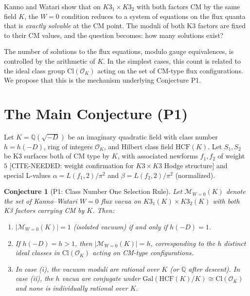 \documentclass[12pt,a4paper]{article}
\theoremstyle{plain}
\newtheorem{conjecture}[theorem]{Conjecture}
\theoremstyle{definition}
\newcommand{\Q}{\mathbb{Q}}
\newcommand{\OK}{\mathcal{O}_K}
\newcommand{\HCF}{\mathrm{HCF}}
\newcommand{\Gal}{\mathrm{Gal}}
\begin{document}
Kanno and Watari show \cite{KannoWatari2024} that on $K3_1 \times K3_2$
with both factors CM by the same field $K$, the $W=0$ condition reduces to
a system of equations on the flux quanta that is \emph{exactly solvable} at
the CM point. The moduli of both K3 factors are fixed to their CM values,
and the question becomes: how many solutions exist?

The number of solutions to the flux equations, modulo gauge equivalences, is
controlled by the arithmetic of $K$. In the simplest cases, this count is
related to the ideal class group $\mathrm{Cl}(\OK)$ acting on the set of
CM-type flux configurations. We propose that this is the mechanism underlying
Conjecture P1.

\section{The Main Conjecture (P1)}
\label{sec:conjecture}

Let $K = \Q(\sqrt{-D})$ be an imaginary quadratic field with class number
$h = h(-D)$, ring of integers $\OK$, and Hilbert class field $\HCF(K)$.
Let $S_1, S_2$ be K3 surfaces both of CM type by $K$, with associated
newforms $f_1, f_2$ of weight $5$ [CITE-NEEDED: weight confirmation for
$K3 \times K3$ Hodge structure] and special L-values
$\alpha = L(f_1, 2) / \pi^2$ and $\beta = L(f_2, 2) / \pi^2$ (normalized).

\begin{conjecture}[P1: Class Number One Selection Rule]
\label{conj:P1}
Let $\mathcal{M}_{W=0}(K)$ denote the set of Kanno--Watari $W=0$
flux vacua on $K3_1(K) \times K3_2(K)$ with both K3 factors carrying CM
by $K$. Then:
\begin{enumerate}
  \item[\rm(i)] $|\mathcal{M}_{W=0}(K)| = 1$ \emph{(isolated vacuum)} if and
    only if $h(-D) = 1$.
  \item[\rm(ii)] If $h(-D) = h > 1$, then $|\mathcal{M}_{W=0}(K)| = h$,
    corresponding to the $h$ distinct ideal classes in $\mathrm{Cl}(\OK)$
    acting on CM-type configurations.
  \item[\rm(iii)] In case (i), the vacuum moduli are rational over $K$
    (or $\Q$ after descent). In case (ii), the $h$ vacua are conjugate
    under $\Gal(\HCF(K)/K) \cong \mathrm{Cl}(\OK)$ and none is individually
    rational over $K$.
\end{enumerate}
\end{conjecture}
\end{document}
